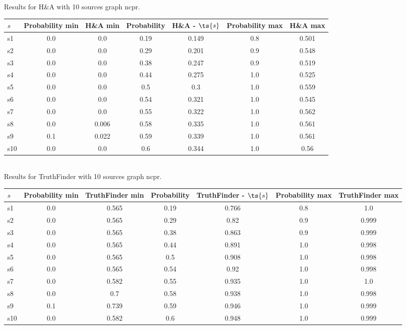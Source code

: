 \documentclass{article}
\begin{document}
\noindent Results for H\&A with 10 sources graph ncpr.

\noindent\begin{tabular}{|l|c|c|c|c|c|c|}
\hline
$s$& Probability min & H\&A min & Probability & H\&A - $\ts{s}$ & Probability max & H\&A max\\
\hline
s1 &0.0 & 0.0 & 0.19 & 0.149 & 0.8 & 0.501\\
\hline
s2 &0.0 & 0.0 & 0.29 & 0.201 & 0.9 & 0.548\\
\hline
s3 &0.0 & 0.0 & 0.38 & 0.247 & 0.9 & 0.519\\
\hline
s4 &0.0 & 0.0 & 0.44 & 0.275 & 1.0 & 0.525\\
\hline
s5 &0.0 & 0.0 & 0.5 & 0.3 & 1.0 & 0.559\\
\hline
s6 &0.0 & 0.0 & 0.54 & 0.321 & 1.0 & 0.545\\
\hline
s7 &0.0 & 0.0 & 0.55 & 0.322 & 1.0 & 0.562\\
\hline
s8 &0.0 & 0.006 & 0.58 & 0.335 & 1.0 & 0.561\\
\hline
s9 &0.1 & 0.022 & 0.59 & 0.339 & 1.0 & 0.561\\
\hline
s10 &0.0 & 0.0 & 0.6 & 0.344 & 1.0 & 0.56\\
\hline
\end{tabular}\\

\noindent Results for TruthFinder with 10 sources graph ncpr.

\noindent\begin{tabular}{|l|c|c|c|c|c|c|}
\hline
$s$& Probability min & TruthFinder min & Probability & TruthFinder - $\ts{s}$ & Probability max & TruthFinder max\\
\hline
s1 &0.0 & 0.565 & 0.19 & 0.766 & 0.8 & 1.0\\
\hline
s2 &0.0 & 0.565 & 0.29 & 0.82 & 0.9 & 0.999\\
\hline
s3 &0.0 & 0.565 & 0.38 & 0.863 & 0.9 & 0.999\\
\hline
s4 &0.0 & 0.565 & 0.44 & 0.891 & 1.0 & 0.998\\
\hline
s5 &0.0 & 0.565 & 0.5 & 0.908 & 1.0 & 0.998\\
\hline
s6 &0.0 & 0.565 & 0.54 & 0.92 & 1.0 & 0.998\\
\hline
s7 &0.0 & 0.582 & 0.55 & 0.935 & 1.0 & 1.0\\
\hline
s8 &0.0 & 0.7 & 0.58 & 0.938 & 1.0 & 0.998\\
\hline
s9 &0.1 & 0.739 & 0.59 & 0.946 & 1.0 & 0.999\\
\hline
s10 &0.0 & 0.582 & 0.6 & 0.948 & 1.0 & 0.999\\
\hline
\end{tabular}\\
\end{document}
